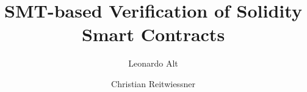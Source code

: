 \documentclass{llncs}
\begin{document}
\pagestyle{plain}

\title{SMT-based Verification of Solidity Smart Contracts}

\author{Leonardo Alt \and Christian Reitwiessner}
\maketitle










\end{document}
